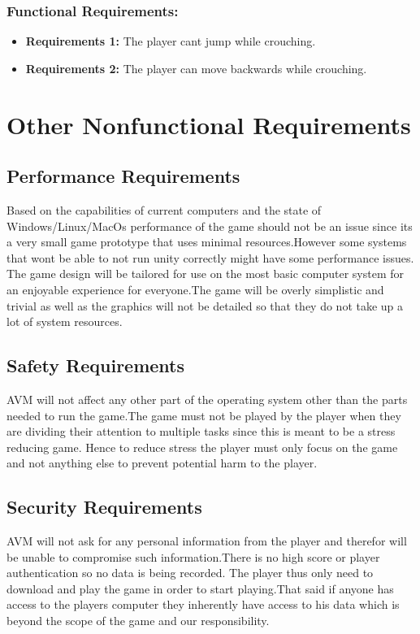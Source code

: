 \subsection{Functional Requirements:}
\begin{itemize}
    \item \textbf{Requirements 1:} The player cant jump while crouching.
    \item \textbf{Requirements 2:} The player can move backwards while crouching.
\end{itemize}
\chapter{Other Nonfunctional Requirements}
\label{Other Nonfunctional Requirements}

\section{Performance Requirements}
Based on the capabilities of current computers and the state of Windows/Linux/MacOs performance of the game should not be an issue since its a very small game prototype that uses minimal resources.However some systems that wont be able to not run unity correctly might have some performance issues. The game design will be tailored for use on the most basic computer system for an enjoyable experience for everyone.The game will be overly simplistic and trivial as well as the graphics will not be detailed so that they do not take up a lot of system resources. 
\section{Safety Requirements}
AVM will not affect any other part of the operating system other than the parts needed to run the game.The game must not be played by the player when they are dividing their attention to multiple tasks since this is meant to be a stress reducing game. Hence to reduce stress the player must only focus on the game and not anything else to prevent potential harm to the player.
\section{Security Requirements}
AVM will not ask for any personal information from the player and therefor will be unable to compromise such information.There is no high score or  player authentication so no data is being recorded. The player thus only need to download and play the game in order to start playing.That said if anyone has access to the players computer they inherently have access to his data which is beyond the scope of the game and our responsibility.
